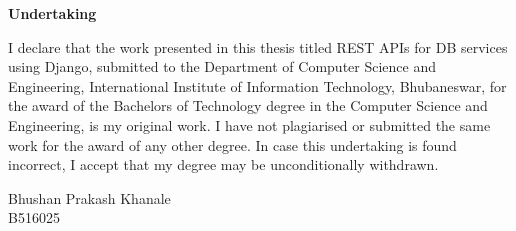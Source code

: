 \centerline{\Large{\bf Undertaking}}
\vspace{1cm}

I declare that the work presented in this thesis titled
REST APIs for DB services using Django, submitted to the Department of
Computer Science and Engineering, International Institute of Information
Technology, Bhubaneswar, for the award of the Bachelors of Technology degree
in the Computer Science and Engineering, is my original work. I have not
plagiarised or submitted the same work for the award of any other degree.
In case this undertaking is found incorrect, I accept that my degree may be
unconditionally withdrawn.

\vspace*{0.5in}
\begin{flushright}
Bhushan Prakash Khanale\\
B516025
\end{flushright}
